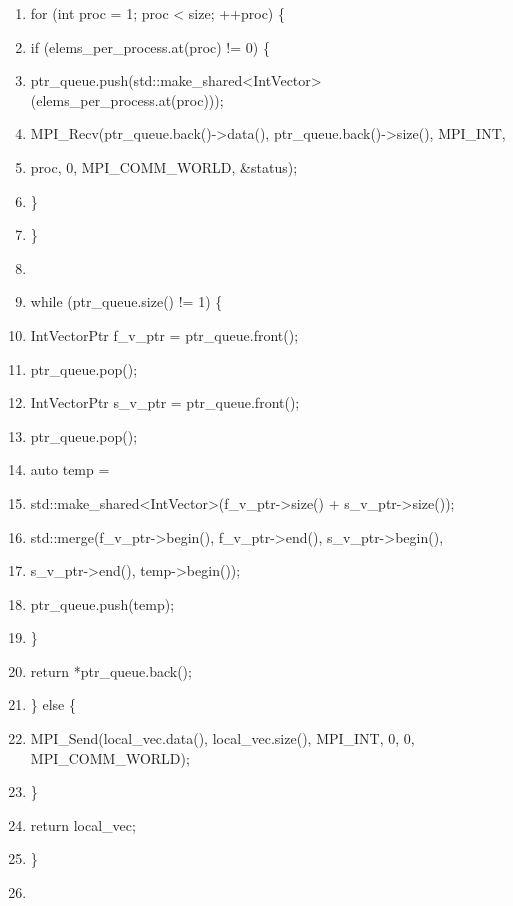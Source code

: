 \documentclass[]{article}
\begin{document}
\begin{enumerate}
\item
  for (int proc = 1; proc \textless{} size; ++proc) \{
\item
  if (elems\_per\_process.at(proc) != 0) \{
\item
  ptr\_queue.push(std::make\_shared\textless{}IntVector\textgreater{}(elems\_per\_process.at(proc)));
\item
  MPI\_Recv(ptr\_queue.back()-\textgreater{}data(),
  ptr\_queue.back()-\textgreater{}size(), MPI\_INT,
\item
  proc, 0, MPI\_COMM\_WORLD, \&status);
\item
  \}
\item
  \}
\item
\item
  while (ptr\_queue.size() != 1) \{
\item
  IntVectorPtr f\_v\_ptr = ptr\_queue.front();
\item
  ptr\_queue.pop();
\item
  IntVectorPtr s\_v\_ptr = ptr\_queue.front();
\item
  ptr\_queue.pop();
\item
  auto temp =
\item
  std::make\_shared\textless{}IntVector\textgreater{}(f\_v\_ptr-\textgreater{}size()
  + s\_v\_ptr-\textgreater{}size());
\item
  std::merge(f\_v\_ptr-\textgreater{}begin(),
  f\_v\_ptr-\textgreater{}end(), s\_v\_ptr-\textgreater{}begin(),
\item
  s\_v\_ptr-\textgreater{}end(), temp-\textgreater{}begin());
\item
  ptr\_queue.push(temp);
\item
  \}
\item
  return *ptr\_queue.back();
\item
  \} else \{
\item
  MPI\_Send(local\_vec.data(), local\_vec.size(), MPI\_INT, 0, 0,
  MPI\_COMM\_WORLD);
\item
  \}
\item
  return local\_vec;
\item
  \}
\item
\end{enumerate}
\end{document}
